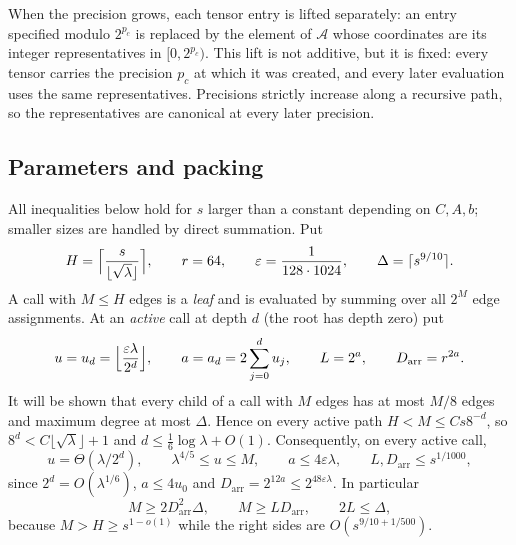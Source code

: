 \documentclass[11pt,reqno]{amsart}
\numberwithin{equation}{section}
\theoremstyle{plain}
\theoremstyle{definition}
\theoremstyle{remark}
\newcommand{\cA}{\mathcal{A}}
\newcommand{\Darr}{D_{\mathrm{arr}}}
\begin{document}
When the precision grows, each tensor entry is lifted separately: an entry
specified modulo $2^{p_c}$ is replaced by the element of $\cA$ whose coordinates
are its integer representatives in $[0,2^{p_c})$. This lift is not additive, but
it is fixed: every tensor carries the precision $p_c$ at which it was created,
and every later evaluation uses the same representatives. Precisions strictly
increase along a recursive path, so the representatives are canonical at every
later precision.

\subsection{Parameters and packing}\label{app:packing}
All inequalities below hold for $s$ larger than a constant depending on
$C,A,b$; smaller sizes are handled by direct summation. Put
\[
H=\Bigl\lceil\frac{s}{\lfloor\sqrt\lambda\rfloor}\Bigr\rceil,\qquad r=64,\qquad
\varepsilon=\frac1{128\cdot1024},\qquad\Delta=\lceil s^{9/10}\rceil.
\]
A call with $M\le H$ edges is a \emph{leaf} and is evaluated by summing over
all $2^M$ edge assignments. At an \emph{active} call at depth $d$ (the root has
depth zero) put
\begin{equation}\label{eq:params}
u=u_d=\Bigl\lfloor\frac{\varepsilon\lambda}{2^d}\Bigr\rfloor,\qquad
a=a_d=2\sum_{j=0}^du_j,\qquad L=2^a,\qquad \Darr=r^{2a}.
\end{equation}
It will be shown that every child of a call with $M$ edges has at most $M/8$
edges and maximum degree at most $\Delta$. Hence on every active path
$H<M\le Cs8^{-d}$, so $8^d<C\lfloor\sqrt\lambda\rfloor+1$ and
$d\le\frac16\log\lambda+O(1)$. Consequently, on every active call,
\begin{equation}\label{eq:inv1}
u=\Theta(\lambda/2^d),\qquad \lambda^{4/5}\le u\le M,\qquad a\le4\varepsilon\lambda,
\qquad L,\Darr\le s^{1/1000},
\end{equation}
since $2^d=O(\lambda^{1/6})$, $a\le4u_0$ and $\Darr=2^{12a}\le2^{48\varepsilon\lambda}$.
In particular
\begin{equation}\label{eq:inv2}
M\ge2\Darr^2\Delta,\qquad M\ge L\Darr,\qquad 2L\le\Delta,
\end{equation}
because $M>H\ge s^{1-o(1)}$ while the right sides are $O(s^{9/10+1/500})$.
\end{document}
